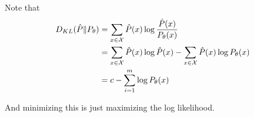 \begin{answer}
    Note that
    $$
    \begin{aligned}
        D_{KL}(\hat P\|P_\theta) &=  \sum_{x\in\cal X} \hat P(x)\log \frac{\hat P(x)}{P_\theta(x)}\\
        &= \sum_{x\in\cal X}\hat P(x)\log\hat P(x) - \sum_{x\in\cal X}\hat P(x)\log P_\theta(x)\\
        &= c - \sum_{i=1}^m \log P_\theta(x)
    \end{aligned}
    $$

    And minimizing this is just maximizing the log likelihood. 
\end{answer}
